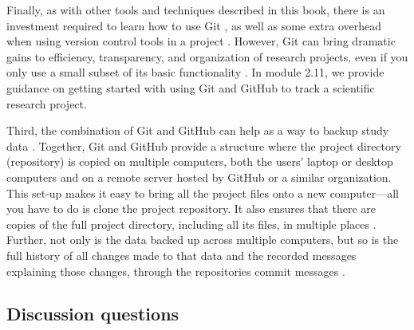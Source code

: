 \documentclass[]{tufte-book}
\begin{document}
Finally, as with other tools and techniques described in this book, there is an
investment required to learn how to use Git \citep{perez2016ten}, as well
as some extra overhead when using version control tools in a project
\citep{raymond2003art}. However, Git can bring dramatic gains to
efficiency, transparency, and organization of research projects, even if you
only use a small subset of its basic functionality \citep{perez2016ten}. In module
2.11, we provide guidance on getting started with using Git and GitHub to track
a scientific research project.

Third, the combination of Git and GitHub can help as a way to backup study data
\citep{blischak2016quick, perez2016ten, perkel2018git}. Together, Git and GitHub
provide a structure where the project directory (repository) is copied on
multiple computers, both the users' laptop or desktop computers and on a remote
server hosted by GitHub or a similar organization. This set-up makes it easy to
bring all the project files onto a new computer---all you have to do is clone
the project repository. It also ensures that there are copies of the full
project directory, including all its files, in multiple places
\citep{blischak2016quick}. Further, not only is the data backed up across multiple
computers, but so is the full history of all changes made to that data and the
recorded messages explaining those changes, through the repositories commit
messages \citep{perez2016ten}.

\subsection{Discussion questions}\label{discussion-questions-1}
\end{document}
